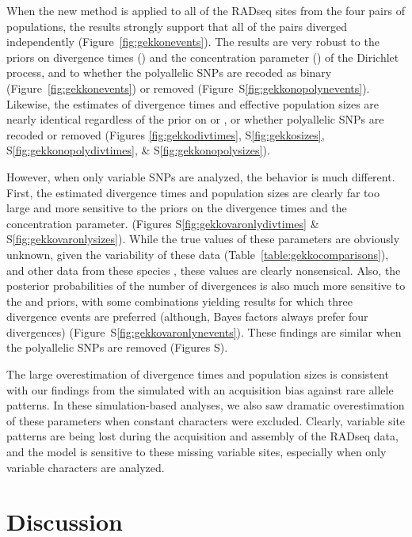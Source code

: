 When the new method is applied to all of the RADseq sites from the
four pairs of  populations, the results strongly
support that all of the pairs diverged independently
(Figure~\ref{fig:gekkonevents}).
The results are very robust to the priors on divergence times (\divtime)
and the concentration parameter (\concentration) of the Dirichlet process, and
to whether the polyallelic SNPs are recoded as binary
(Figure~\ref{fig:gekkonevents})
or removed
(Figure~S\ref{fig:gekkonopolynevents}).
Likewise, the estimates of divergence times and effective population sizes
are nearly identical regardless of the prior on \divtime or \concentration,
or whether polyallelic SNPs are recoded or removed
(Figures
\ref{fig:gekkodivtimes},
S\ref{fig:gekkosizes},
S\ref{fig:gekkonopolydivtimes},
\&
S\ref{fig:gekkonopolysizes}).

However, when only variable SNPs are analyzed, the behavior is much different.
First, the estimated divergence times and population sizes are clearly far too
large and more sensitive to the priors on the divergence times and the
concentration parameter.
(Figures
S\ref{fig:gekkovaronlydivtimes}
\&
S\ref{fig:gekkovaronlysizes}).
While the true values of these parameters are obviously unknown, given the
variability of these data (Table~\ref{table:gekkocomparisons}), and other data
from these species \citep{Siler2012, Siler2014kikuchii}, these values are
clearly nonsensical.
Also, the posterior probabilities of the number of divergences is also
much more sensitive to the \divtime and \concentration priors,
with some combinations yielding results for which three divergence events
are preferred (although, Bayes factors always prefer four divergences)
(Figure~S\ref{fig:gekkovaronlynevents}).
These findings are similar when the polyallelic SNPs are removed
(Figures
S).

The large overestimation of divergence times and population sizes is consistent
with our findings from the \datasets simulated with an acquisition bias against
rare allele patterns.
In these simulation-based analyses, we also saw dramatic overestimation of
these parameters when constant characters were excluded.
Clearly, variable site patterns are being lost during the acquisition and
assembly of the RADseq data, and the model is sensitive to these missing
variable sites, especially when only variable characters are analyzed.


\section{Discussion}


